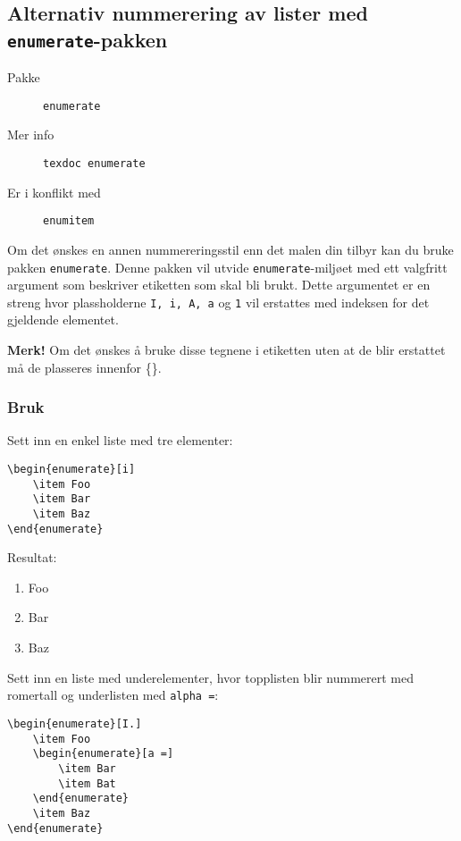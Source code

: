 \subsection{Alternativ nummerering av lister med \texttt{enumerate}-pakken}
\label{pkg:enumerate}
\begin{description}
    \item[Pakke] \texttt{enumerate}
    \item[Mer info] \texttt{texdoc enumerate}
    \item[Er i konflikt med] \texttt{enumitem}
\end{description}

Om det ønskes en annen nummereringsstil enn det malen din tilbyr kan du bruke pakken \texttt{enumerate}.
Denne pakken vil utvide \texttt{enumerate}-miljøet med ett valgfritt argument som beskriver etiketten som skal bli brukt.
Dette argumentet er en streng hvor plassholderne \texttt{I, i, A, a} og \texttt{1} vil erstattes med indeksen for det gjeldende
elementet.

\textbf{Merk!} Om det ønskes å bruke disse tegnene i etiketten uten at de blir erstattet må de plasseres innenfor \{\}.

\subsubsection*{Bruk}
Sett inn en enkel liste med tre elementer:
\vspace{0.75em}
\begin{lstlisting}[language=Tex]
\begin{enumerate}[i]
    \item Foo
    \item Bar
    \item Baz
\end{enumerate}
\end{lstlisting}

\noindent Resultat:
\begin{enumerate}[i]
    \item Foo
    \item Bar
    \item Baz
\end{enumerate}
\vspace{0.75em}


\horizontalrule


\noindent Sett inn en liste med underelementer, hvor topplisten blir nummerert med romertall og underlisten med \texttt{alpha =}:
\vspace{0.75em}
\begin{lstlisting}[language=Tex]
\begin{enumerate}[I.]
    \item Foo
    \begin{enumerate}[a =]
        \item Bar
        \item Bat
    \end{enumerate}
    \item Baz
\end{enumerate}
\end{lstlisting}
\vspace{0.75em}

